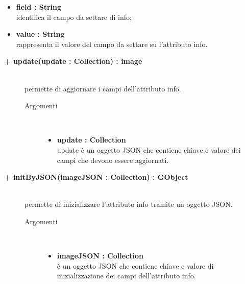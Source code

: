 \begin{description}
\begin{description}
\begin{description}
\begin{itemize}
					\item \textbf{field : String			} \hfill \\
					identifica il campo da settare di info;
					\item \textbf{value : String			} \hfill \\
					rappresenta il valore del campo da settare su l'attributo info.
				\end{itemize}
		\end{description}

\end{description}

\begin{description}
		\item[\textbf{\color{blue}+ update(update : Collection) : image			}] \hfill \\
			permette di aggiornare i campi dell'attributo info.
			
		\begin{description}
			\item[Argomenti] \hfill \\
				\begin{itemize}
				
					\item \textbf{update : Collection			} \hfill \\
					update è un oggetto JSON che contiene chiave e valore dei campi che devono essere aggiornati. 
				\end{itemize}
		\end{description}

\end{description}

\begin{description}
		\item[\textbf{\color{blue}+ initByJSON(imageJSON : Collection) : GObject			}] \hfill \\
			permette di inizializzare l'attributo info tramite un oggetto JSON. 
			
		\begin{description}
			\item[Argomenti] \hfill \\
				\begin{itemize}
				
					\item \textbf{imageJSON : Collection			} \hfill \\
					è un oggetto JSON che contiene chiave e valore di inizializzazione dei campi dell'attributo info. 
				\end{itemize}
		\end{description}


\end{description}
\end{description}
